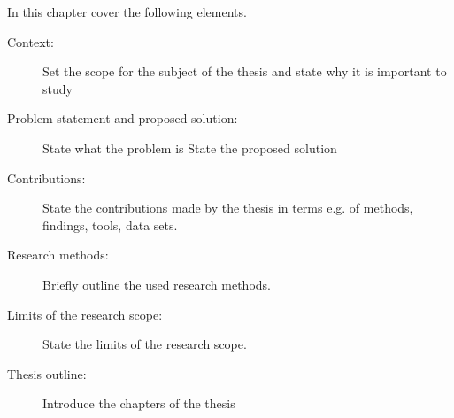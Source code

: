 In this chapter cover the following elements.
\begin{description}
\item[Context:]
Set the scope for the subject of the thesis
and state why it is important to study

\item[Problem statement and proposed solution:]
State what the problem is State the proposed solution

\item[Contributions:]
State the contributions made by the thesis in terms e.g. of
methods, findings, tools, data sets.

\item[Research methods:]
Briefly outline the used research methods.

\item[Limits of the research scope:]
State the limits of the research scope.

\item[Thesis outline:]
Introduce the chapters of the thesis
\end{description}
